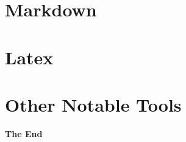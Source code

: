 \documentclass[aspectratio=169,xcolor=dvipsnames,svgnames,x11names,fleqn]{beamer}
\begin{document}
\section{Markdown}

\begin{frame}
    \sectionpage
\end{frame}

\section{Latex}

\begin{frame}
    \sectionpage
\end{frame}

\section{Other Notable Tools}

\begin{frame}
    \sectionpage
\end{frame}

\begin{frame}
    \Huge{\centerline{\color{bubblegumPink}\textbf{The End}}}
\end{frame}
\end{document}
